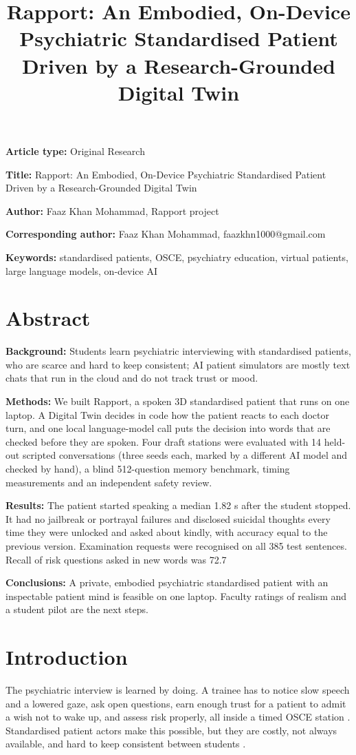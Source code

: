 \documentclass{article}
\title{Rapport: An Embodied, On-Device Psychiatric Standardised Patient Driven by a Research-Grounded Digital Twin}
\begin{document}
\maketitle
\textbf{Article type:} Original Research

\textbf{Title:} Rapport: An Embodied, On-Device Psychiatric Standardised Patient Driven by a Research-Grounded Digital Twin

\textbf{Author:} Faaz Khan Mohammad, Rapport project

\textbf{Corresponding author:} Faaz Khan Mohammad, faazkhn1000@gmail.com

\textbf{Keywords:} standardised patients, OSCE, psychiatry education, virtual patients, large language models, on-device AI

\section*{Abstract}
\textbf{Background:} Students learn psychiatric interviewing with standardised patients, who are scarce and hard to keep consistent; AI patient simulators are mostly text chats that run in the cloud and do not track trust or mood.

\textbf{Methods:} We built Rapport, a spoken 3D standardised patient that runs on one laptop. A Digital Twin decides in code how the patient reacts to each doctor turn, and one local language-model call puts the decision into words that are checked before they are spoken. Four draft stations were evaluated with 14 held-out scripted conversations (three seeds each, marked by a different AI model and checked by hand), a blind 512-question memory benchmark, timing measurements and an independent safety review.

\textbf{Results:} The patient started speaking a median 1.82 s after the student stopped. It had no jailbreak or portrayal failures and disclosed suicidal thoughts every time they were unlocked and asked about kindly, with accuracy equal to the previous version. Examination requests were recognised on all 385 test sentences. Recall of risk questions asked in new words was 72.7%

\textbf{Conclusions:} A private, embodied psychiatric standardised patient with an inspectable patient mind is feasible on one laptop. Faculty ratings of realism and a student pilot are the next steps.

\section{Introduction}
The psychiatric interview is learned by doing. A trainee has to notice slow speech and a lowered gaze, ask open questions, earn enough trust for a
patient to admit a wish not to wake up, and assess risk properly, all inside a timed OSCE station \cite{harden1975osce}. Standardised patient actors
make this possible, but they are costly, not always available, and hard to keep consistent between students \cite{piot2021simulation}.
\end{document}
